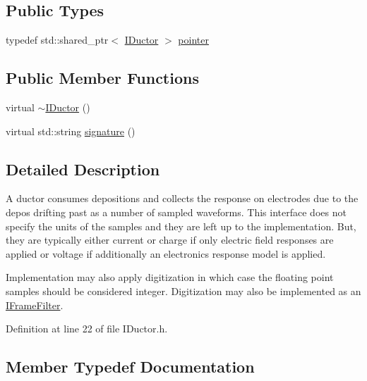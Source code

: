 \subsection*{Public Types}
\begin{DoxyCompactItemize}
\item 
typedef std\+::shared\+\_\+ptr$<$ \hyperlink{class_wire_cell_1_1_i_ductor}{I\+Ductor} $>$ \hyperlink{class_wire_cell_1_1_i_ductor_a66acc2aebf42b1d47baf40bbbc50e3db}{pointer}
\end{DoxyCompactItemize}
\subsection*{Public Member Functions}
\begin{DoxyCompactItemize}
\item 
virtual \hyperlink{class_wire_cell_1_1_i_ductor_af6ad8a9fdd4d1df1930f02e6dd15af1c}{$\sim$\+I\+Ductor} ()
\item 
virtual std\+::string \hyperlink{class_wire_cell_1_1_i_ductor_ac1f7ad244c991efc08719c9bbe38367a}{signature} ()
\end{DoxyCompactItemize}


\subsection{Detailed Description}
A ductor consumes depositions and collects the response on electrodes due to the depos drifting past as a number of sampled waveforms. This interface does not specify the units of the samples and they are left up to the implementation. But, they are typically either current or charge if only electric field responses are applied or voltage if additionally an electronics response model is applied.

Implementation may also apply digitization in which case the floating point samples should be considered integer. Digitization may also be implemented as an \hyperlink{class_wire_cell_1_1_i_frame_filter}{I\+Frame\+Filter}. 

Definition at line 22 of file I\+Ductor.\+h.



\subsection{Member Typedef Documentation}
\mbox{\label{class_wire_cell_1_1_i_ductor_a66acc2aebf42b1d47baf40bbbc50e3db}} 
